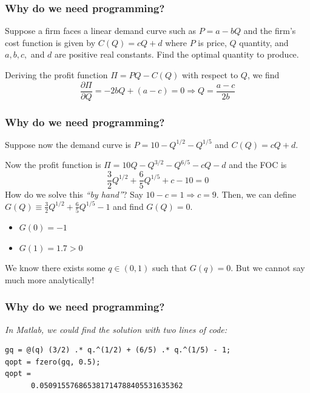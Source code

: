 \documentclass[11pt,xcolor={svgnames},aspectratio=169,usepdftitle=false,notheorems]{beamer}
\begin{document}
\begin{frame}[c]
  \frametitle{Why do we need programming?}
  \begin{exercise}
   Suppose a firm faces a linear demand curve such as $P = a - b Q$ and the firm's cost function is given by $C(Q) = cQ + d$ where $P$ is price, $Q$ quantity, and $a,b,c,$ and $d$ are positive real constants. Find the optimal quantity to produce.
  \end{exercise}
  \pause
  \begin{solution}
   Deriving the profit function $\Pi = PQ - C(Q)$ with respect to $Q$, we find
   \[
     \frac{\partial \Pi}{\partial Q} = -2b Q + (a - c) = 0 \Rightarrow Q = \frac{a - c}{2b} 
   \]
  \end{solution}
  
\end{frame}

\begin{frame}[c]
  \frametitle{Why do we need programming?}
 \begin{exercise}
   Suppose now the demand curve is $P = 10 - Q^{1/2} - Q^{1/5}$ and $C(Q) = cQ + d$.
 \end{exercise}

 \begin{solution}
   Now the profit function is $\Pi = 10Q - Q^{3/2} - Q^{6/5} - cQ - d$ and the FOC is 
   \[
     \frac{3}{2} Q^{1/2} + \frac{6}{5}Q^{1/5} + c - 10 = 0 
   \]
   How do we solve this \textit{``by hand''}? Say $10 - c = 1 \Rightarrow c = 9$. Then, we can define $G(Q) \equiv \frac{3}{2} Q^{1/2} + \frac{6}{5}Q^{1/5} - 1$ and find $G(Q) = 0$.
   \begin{itemize}
    \item $G(0) = -1$
    \item $G(1) = 1.7 > 0$
   \end{itemize}
   We know there exists some $q\in(0,1)$ such that $G(q) = 0$. But we cannot say much more analytically!
 \end{solution}
 
\end{frame}

\begin{frame}[fragile]
  \frametitle{Why do we need programming?}
  \textit{In Matlab, we could find the solution with two lines of code:}
 \begin{lstlisting}
gq = @(q) (3/2) .* q.^(1/2) + (6/5) .* q.^(1/5) - 1;
qopt = fzero(gq, 0.5);
qopt = 
      0.050915576865381714788405531635362
 \end{lstlisting}
\end{frame}
\end{document}
